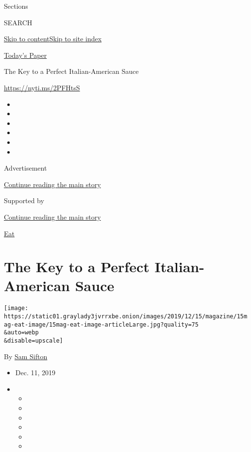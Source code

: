 Sections

SEARCH

\protect\hyperlink{site-content}{Skip to
content}\protect\hyperlink{site-index}{Skip to site index}

\href{https://myaccount.nytimes3xbfgragh.onion/auth/login?response_type=cookie\&client_id=vi}{}

\href{https://www.nytimes3xbfgragh.onion/section/todayspaper}{Today's
Paper}

The Key to a Perfect Italian-American Sauce

\url{https://nyti.ms/2PFHtsS}

\begin{itemize}
\item
\item
\item
\item
\item
\item
\end{itemize}

Advertisement

\protect\hyperlink{after-top}{Continue reading the main story}

Supported by

\protect\hyperlink{after-sponsor}{Continue reading the main story}

\href{/column/magazine-eat}{Eat}

\hypertarget{the-key-to-a-perfect-italian-american-sauce}{%
\section{The Key to a Perfect Italian-American
Sauce}\label{the-key-to-a-perfect-italian-american-sauce}}

\texttt{[image: https://static01.graylady3jvrrxbe.onion/images/2019/12/15/magazine/15mag-eat-image/15mag-eat-image-articleLarge.jpg?quality=75\\\&auto=webp\\\&disable=upscale]}

By \href{https://www.nytimes3xbfgragh.onion/by/sam-sifton}{Sam Sifton}

\begin{itemize}
\item
  Dec. 11, 2019
\item
  \begin{itemize}
  \item
  \item
  \item
  \item
  \item
  \item
  \end{itemize}
\end{itemize}

